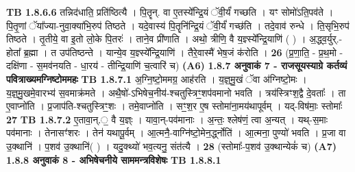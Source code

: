 \documentclass[17pt]{extarticle}
\begin{document}
                  \newline
                                \textbf{ TB 1.8.6.6} \newline
                  तन्निद॑धाति॒ प्रति॑ष्ठित्यै । पि॒तॄन्. वा ए॒तस्ये᳚न्द्रि॒यं ॅवी॒र्यं॑ गच्छति । यꣳ सोमो॑ऽति॒पव॑ते । पि॒तृ॒णां ॅया᳚ज्या-नुवा॒क्या॑भि॒रुप॑ तिष्ठते । यदे॒वास्य॑ पि॒तॄनि॑न्द्रि॒यं ॅवी॒र्यं॑ गच्छ॑ति । तदे॒वाव॑ रुन्धे । ति॒सृभि॒रुप॑ तिष्ठते । तृ॒तीये॒ वा इ॒तो लो॒के पि॒तरः॑ । ताने॒व प्री॑णाति । अथो॒ त्रीणि॒ वै य॒ज्ञ्स्ये᳚न्द्रि॒याणि॑ ( ) । अ॒द्ध्व॒र्युर्.-होता᳚ ब्र॒ह्मा । त उप॑तिष्ठन्ते । यान्ये॒व य॒ज्ञ्स्ये᳚न्द्रि॒याणि॑ । तैरे॒वास्मै॑ भेष॒जं क॑रोति । \textbf{ 26} \newline
                  \newline
                                    (प्र॒॒णा॒ति॒ - प्र॒थ॒मो - दक्षि॑णा - स॒मव॑नयति - धा॒रय॑ - तीन्द्रि॒याणि॑ च॒त्वारि॑ च) \textbf{(A6)} \newline \newline
                \textbf{ 1.8.7     अनुवाकं   7 - राजसूयस्याग्रे कर्तव्यं पवित्राख्यमग्निष्टोममहः} \newline
                                \textbf{ TB 1.8.7.1} \newline
                  अ॒ग्नि॒ष्टो॒ममग्र॒ आह॑रति । य॒ज्ञ्॒मु॒खं ॅवा अ॑ग्निष्टो॒मः । य॒ज्ञ्॒मु॒खमे॒वारभ्य॑ स॒वमाक्र॑मते । अथै॒षो॑-ऽभिषेच॒नीय॑-श्चतुस्त्रिꣳ॒॒शप॑वमानो भवति । त्रय॑स्त्रिꣳश॒द्वै दे॒वताः᳚ । ता ए॒वाप्नो॑ति । प्र॒जाप॑ति-श्चतुस्त्रिꣳ॒॒शः । तमे॒वाप्नो॑ति । सꣳ॒॒श॒र ए॒ष स्तोमा॑ना॒मय॑थापूर्वम् । यद्-विष॑माः॒ स्तोमाः᳚ \textbf{ 27} \newline
                  \newline
                                \textbf{ TB 1.8.7.2} \newline
                  ए॒तावा॒न्.॒ वै य॒ज्ञ्ः । यावा॒न्-पव॑मानाः । अ॒न्तः॒ श्लेष॑णं॒ त्वा अ॒न्यत् । यथ्-स॒माः पव॑मानाः । तेनासꣳ॑शरः । तेन॑ यथापू॒र्वम् । आ॒त्मनै॒-वाग्नि॑ष्टो॒मेन॒र्द्ध्नोति॑ । आ॒त्मना॒ पुण्यो॑ भवति । प्र॒जा वा उ॒क्थानि॑ । प॒शव॑ उ॒क्थानि॑( ) । यदु॒क्थ्यो॑ भव॒त्यनु॒ संत॑त्यै । \textbf{ 28} \newline
                  \newline
                                    (स्तोमाः᳚-प॒शव॑ उ॒क्थान्येकं॑ च) \textbf{(A7)} \newline \newline
                \textbf{ 1.8.8     अनुवाकं   8 - अभिषेचनीये साममन्त्रविशेषः} \newline
                                \textbf{ TB 1.8.8.1} \newline
\end{document}
